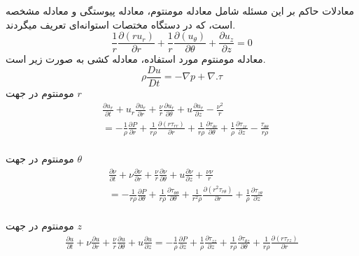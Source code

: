 معادلات حاکم بر این مسئله شامل معادله مومنتوم،‌ معادله پیوستگی و معادله مشخصه است، که در دستگاه مختصات استوانه‌ای تعریف میگردند.
\begin{equation}
	\frac{1}{r} \frac{\partial\left(r u_{r}\right)}{\partial r}+\frac{1}{r} \frac{\partial\left(u_{\theta}\right)}{\partial \theta}+\frac{\partial u_{z}}{\partial z}=0
\end{equation}
معادله مومنتوم مورد استفاده، معادله کشی به صورت زیر است.
\begin{equation}
	\rho\frac{Du}{Dt} = -\nabla p + \nabla . \tau
\end{equation}
مومنتوم در جهت $r$
\begin{equation}
	\begin{split}
		&\frac{\partial u_r}{\partial t} + u_r \frac{\partial u_r}{\partial r} + \frac{\nu}{r} \frac{\partial u_r}{\partial\theta} + u \frac{\partial u_r}{\partial z} - \frac{\nu^2}{r}\\
		&= -\frac{1}{\rho} \frac{\partial P}{\partial r} + \frac{1}{r\rho}\frac{\partial\left(r\tau_{rr}\right)}{\partial r} + \frac{1}{r\rho} \frac{\partial\tau_{\theta r}}{\partial\theta} + \frac{1}{\rho} \frac{\partial\tau_{zr}}{\partial z} - \frac{\tau_{\theta\theta}}{r\rho} 
	\end{split}
\end{equation}
\\
مومنتوم در جهت $\theta$
\begin{equation}
	\begin{split}
		&\frac{\partial \nu}{\partial t} + \nu \frac{\partial \nu}{\partial r} + \frac{\nu}{r} \frac{\partial \nu}{\partial\theta} + u \frac{\partial \nu}{\partial z} + \frac{\nu \nu}{r}\\
		&= -\frac{1}{r\rho} \frac{\partial P}{\partial\theta} + \frac{1}{r\rho}\frac{\partial\tau_{\theta \theta}}{\partial\theta} + \frac{1}{r^2 \rho} \frac{\partial\left(r^2 \tau_{r\theta}\right)}{\partial r} + \frac{1}{\rho} \frac{\partial\tau_{z\theta}}{\partial z} 
	\end{split}
\end{equation}
\\
مومنتوم در جهت $z$
\begin{equation}
	\begin{split}
\frac{\partial u}{\partial t} + \nu \frac{\partial u}{\partial r} + \frac{\nu}{r} \frac{\partial u}{\partial\theta} + u \frac{\partial u}{\partial z}
= -\frac{1}{\rho} \frac{\partial P}{\partial z} + \frac{1}{\rho} \frac{\partial\tau_{zz}}{\partial z} + \frac{1}{r\rho}\frac{\partial\tau_{\theta z}}{\partial\theta} + \frac{1}{r\rho}\frac{\partial\left(r\tau_{rz}\right)}{\partial r}
	\end{split}
\end{equation}
